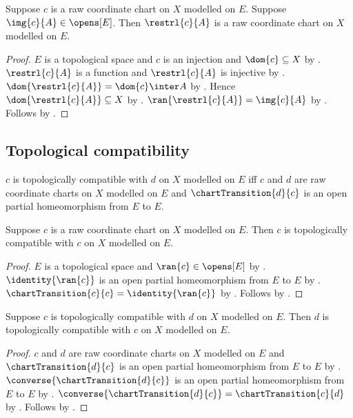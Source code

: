 \begin{theorem}\label{raw_coordinate_chart_restriction}
    Suppose $c$ is a raw coordinate chart on $X$ modelled on $E$.
    Suppose $\img{c}{A}\in\opens[E]$.
    Then $\restrl{c}{A}$ is a raw coordinate chart on $X$ modelled on $E$.
\end{theorem}
\begin{proof}
    $E$ is a topological space and $c$ is an injection and
        $\dom{c}\subseteq X$ by .
    $\restrl{c}{A}$ is a function and $\restrl{c}{A}$ is injective by
        .
    $\dom{\restrl{c}{A}}=\dom{c}\inter A$ by
        .
    Hence $\dom{\restrl{c}{A}}\subseteq X$ by
        .
    $\ran{\restrl{c}{A}}=\img{c}{A}$ by .
    Follows by .
\end{proof}

\subsection{Topological compatibility}

\begin{definition}\label{raw_chart_compatibility}
    $c$ is topologically compatible with $d$ on $X$ modelled on $E$ iff
        $c$ and $d$ are raw coordinate charts on $X$ modelled on $E$ and
        $\chartTransition{d}{c}$ is an open partial homeomorphism from $E$ to $E$.
\end{definition}

\begin{theorem}\label{raw_chart_compatibility_reflexive}
    Suppose $c$ is a raw coordinate chart on $X$ modelled on $E$.
    Then $c$ is topologically compatible with $c$ on $X$ modelled on $E$.
\end{theorem}
\begin{proof}
    $E$ is a topological space and $\ran{c}\in\opens[E]$ by
        .
    $\identity{\ran{c}}$ is an open partial homeomorphism from $E$ to $E$ by
        .
    $\chartTransition{c}{c}=\identity{\ran{c}}$ by .
    Follows by .
\end{proof}

\begin{theorem}\label{raw_chart_compatibility_symmetric}
    Suppose $c$ is topologically compatible with $d$ on $X$ modelled on $E$.
    Then $d$ is topologically compatible with $c$ on $X$ modelled on $E$.
\end{theorem}
\begin{proof}
    $c$ and $d$ are raw coordinate charts on $X$ modelled on $E$ and
        $\chartTransition{d}{c}$ is an open partial homeomorphism from $E$ to $E$
        by .
    $\converse{\chartTransition{d}{c}}$ is an open partial homeomorphism
        from $E$ to $E$ by .
    $\converse{\chartTransition{d}{c}}=\chartTransition{c}{d}$ by
        .
    Follows by .
\end{proof}

